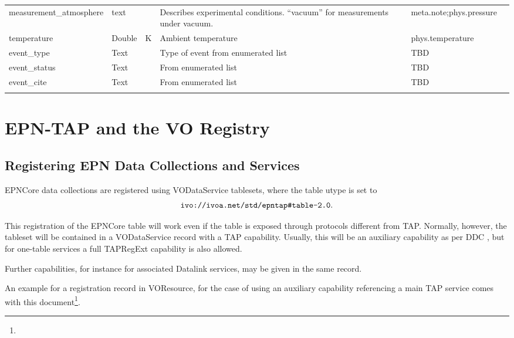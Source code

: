 \documentclass[11pt,a4paper]{ivoa}
\begin{document}
\begin{landscape}
\begin{longtable}{p{3.5cm}p{0.5cm}p{1.4cm}p{1cm}p{7cm}p{5cm}}
measurement\_atmosphere&text&&Describes experimental conditions. ``vacuum'' for measurements under vacuum.&meta.note;phys.pressure&\\

temperature&Double&K&Ambient temperature&phys.temperature&\\

event\_type&Text&&Type of event from enumerated list&TBD&\\

event\_status&Text&&From enumerated list&TBD&\\

event\_cite&Text&&From enumerated list&TBD&\\

\sptablerule

\end{longtable}

\endgroup



\end{landscape}

\section{EPN-TAP and the VO Registry}

\subsection{Registering EPN Data Collections and Services}

EPNCore data collections are registered using VODataService
\citep{2010ivoa.spec.1202P} tablesets, where the table utype is set to
$$\hbox{\verb|ivo://ivoa.net/std/epntap#table-2.0|}.$$

This registration of the EPNCore table will work even if the table is
exposed through protocols different from TAP.  Normally, however, the
tableset will be contained in a VODataService 
record with a TAP capability.  Usually, this will be an auxiliary
capability as per DDC \citep{2019ivoa.rept.0520D}, but for one-table
services a full TAPRegExt \citep{2012ivoa.spec.0827D} capability is also
allowed.

Further capabilities, for instance for associated Datalink services,
may be given in the same record.

An example for a registration record in VOResource, for the case of
using an auxiliary capability referencing a main TAP service comes with
this document\footnote{}.
\end{document}
